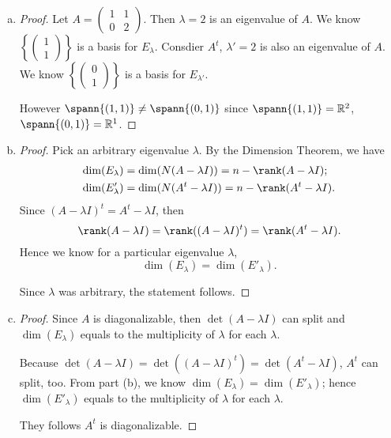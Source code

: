 \begin{Exercise}
	\begin{enumerate}[(a)]
		\item
		\begin{proof}
			Let $A = \begin{pmatrix}
			1 & 1 \\
			0 & 2
			\end{pmatrix}$. Then $\lambda = 2$ is an eigenvalue of $A$. We know $\left\{\begin{pmatrix}
			1 \\
			1
			\end{pmatrix} \right\}$ is a basis for $E_{\lambda}$. Consdier $A^t$, $\lambda' = 2$ is also an eigenvalue of $A$. We know $\left\{\begin{pmatrix}
			0 \\
			1
			\end{pmatrix} \right\}$ is a basis for $E_{\lambda'}$.
			
			However $\spann\{(1,1)\} \neq \spann\{(0,1)\}$ since $\spann\{(1,1)\} = \mathbb{R}^2$, $\spann\{(0,1)\} = \mathbb{R}^1$.
		\end{proof}
		
		\item
		\begin{proof}
			Pick an arbitrary eigenvalue $\lambda$. By the Dimension Theorem, we have
			\begin{align*}
			\dim(E_{\lambda}) &= \dim(N(A-\lambda I)) = n-\rank(A-\lambda I); \\
			\dim(E'_{\lambda}) &= \dim(N(A^t-\lambda I)) = n-\rank(A^t-\lambda I).
			\end{align*}
			Since $(A-\lambda I)^t = A^t - \lambda I$, then 
			$$
			\rank(A-\lambda I) = \rank((A-\lambda I)^t) = \rank(A^t-\lambda I).
			$$
			Hence we know for a particular eigenvalue $\lambda$,
			$$
			\dim(E_{\lambda}) = \dim(E'_{\lambda}).
			$$
			
			Since $\lambda$ was arbitrary, the statement follows.
		\end{proof}
		
		\item
		\begin{proof}
			Since $A$ is diagonalizable, then $\det(A-\lambda I)$ can split and $\dim(E_{\lambda})$ equals to the multiplicity of $\lambda$ for each $\lambda$.
			
			Because $\det(A-\lambda I) = \det((A-\lambda I)^t) = \det(A^t-\lambda I)$, $A^t$ can split, too. From part (b), we know $\dim(E_{\lambda}) = \dim(E'_{\lambda})$; hence $\dim(E'_{\lambda})$ equals to the multiplicity of $\lambda$ for each $\lambda$.
			
			They follows $A^t$ is diagonalizable.
		\end{proof}
	\end{enumerate}
\end{Exercise}